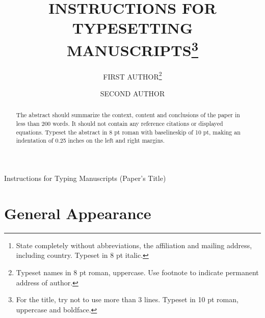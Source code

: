 \documentclass{ws-ijac}
\begin{document}
{Instructions for Typing Manuscripts (Paper's Title)}

%
\catchline{}{}{}{}{}
%

\title{INSTRUCTIONS FOR TYPESETTING
MANUSCRIPTS\footnote{For the title, try not to
use more than 3 lines. Typeset in 10 pt roman, uppercase and boldface.}
}

\author{FIRST AUTHOR\footnote{
Typeset names in 8 pt roman, uppercase. Use footnote to indicate
permanent address of author.}}

\address{University Department, University Name, Address\\
City, State ZIP/Zone,Country\,\footnote{State completely without
abbreviations, the affiliation and mailing address, including country.
Typeset in 8 pt italic.}\\
 }

\author{SECOND AUTHOR}

\address{Group, Laboratory, Address\\
City, State ZIP/Zone, Country\\
author\_id@domain\_name }

\maketitle

\begin{history}
\comby{[editor]}
\end{history}

\begin{abstract}
The abstract should summarize the context, content and conclusions of
the paper in less than 200 words. It should not contain any reference
citations or displayed equations. Typeset the abstract in 8 pt roman
with baselineskip of 10 pt, making an indentation of 0.25 inches on
the left and right margins.
\end{abstract}



\section{General Appearance}	
\end{document}
